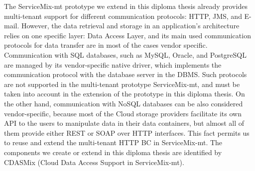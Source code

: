 The ServiceMix-mt prototype we extend in this diploma thesis already provides multi-tenant support for different communication protocols: HTTP, JMS, and E-mail. However, the data retrieval and storage in an application's architecture relies on one specific layer: Data Access Layer, and its main used communication protocols for data transfer are in most of the cases vendor specific. Communication with \ac{SQL} databases, such as MySQL, Oracle, and PostgreSQL are managed by its vendor-specific native driver, which implements the communication protocol with the database server in the \ac{DBMS}. Such protocols are not supported in the multi-tenant prototype ServiceMix-mt, and must be taken into account in the extension of the prototype in this diploma thesis. On the other hand, communication with \ac{NoSQL} databases can be also considered vendor-specific, because most of the Cloud storage providers facilitate its own API to the users to manipulate data in their data containers, but almost all of them provide either REST or \ac{SOAP} over \ac{HTTP} interfaces. This fact permits us to reuse and extend the multi-tenant HTTP \ac{BC} in ServiceMix-mt. The components we create or extend in this diploma thesis are identified by CDASMix (Cloud Data Access Support in ServiceMix-mt).

\FloatBarrier